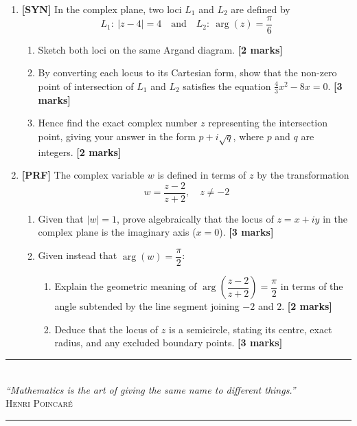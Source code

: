 \documentclass[11pt,a4paper]{article}
\begin{document}
\begin{enumerate}[resume]
\item \textbf{[SYN]} In the complex plane, two loci $L_1$ and $L_2$ are defined by
\[
L_1: \ |z - 4| = 4 \quad \text{and} \quad L_2: \ \arg(z) = \frac{\pi}{6}
\]
\begin{enumerate}[label=(\alph*)]
  \item Sketch both loci on the same Argand diagram. \hfill{\textbf{[2 marks]}}
  \item By converting each locus to its Cartesian form, show that the non-zero point of intersection of $L_1$ and $L_2$ satisfies the equation $\frac{4}{3}x^2 - 8x = 0$. \hfill{\textbf{[3 marks]}}
  \item Hence find the exact complex number $z$ representing the intersection point, giving your answer in the form $p + i\sqrt{q}$, where $p$ and $q$ are integers. \hfill{\textbf{[2 marks]}}
\end{enumerate}

\item \textbf{[PRF]} The complex variable $w$ is defined in terms of $z$ by the transformation
\[
w = \frac{z - 2}{z + 2}, \quad z \neq -2
\]
\begin{enumerate}[label=(\alph*)]
  \item Given that $|w| = 1$, prove algebraically that the locus of $z = x + iy$ in the complex plane is the imaginary axis ($x = 0$). \hfill{\textbf{[3 marks]}}
  \item Given instead that $\arg(w) = \dfrac{\pi}{2}$:
  \begin{enumerate}[label=(\roman*)]
    \item Explain the geometric meaning of $\arg\left(\dfrac{z - 2}{z + 2}\right) = \dfrac{\pi}{2}$ in terms of the angle subtended by the line segment joining $-2$ and $2$. \hfill{\textbf{[2 marks]}}
    \item Deduce that the locus of $z$ is a semicircle, stating its centre, exact radius, and any excluded boundary points. \hfill{\textbf{[3 marks]}}
  \end{enumerate}
\end{enumerate}

\end{enumerate}

\vspace{14pt}
\begin{center}
  {\color{accentline}\rule{0.4\textwidth}{0.4pt}}\\[5pt]
  {\footnotesize\itshape\color{medgray} ``Mathematics is the art of giving the same name to different things.''}\\[2pt]
  {\scriptsize\scshape\color{medgray} Henri Poincar\'e}\\[5pt]
  {\color{accentline}\rule{0.4\textwidth}{0.4pt}}
\end{center}
\end{document}
